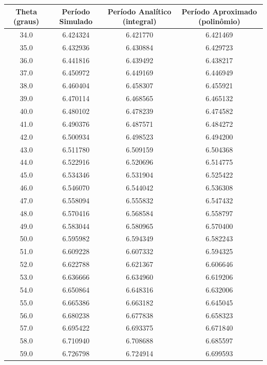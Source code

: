 \documentclass[12pt,a4paper]{article}
\begin{document}
\begin{table}[H]


\begin{center}
\begin{tabular}{|c|c|c|c|}
\hline
Theta (graus) & Período Simulado & Período Analítico (integral) & Período Aproximado (polinômio) \\
\hline
34.0 & 6.424324 & 6.421770 & 6.421469 \\
\hline
35.0 & 6.432936 & 6.430884 & 6.429723 \\
\hline
36.0 & 6.441816 & 6.439492 & 6.438217 \\
\hline
37.0 & 6.450972 & 6.449169 & 6.446949 \\
\hline
38.0 & 6.460404 & 6.458307 & 6.455921 \\
\hline
39.0 & 6.470114 & 6.468565 & 6.465132 \\
\hline
40.0 & 6.480102 & 6.478239 & 6.474582 \\
\hline
41.0 & 6.490376 & 6.487571 & 6.484272 \\
\hline
42.0 & 6.500934 & 6.498523 & 6.494200 \\
\hline
43.0 & 6.511780 & 6.509159 & 6.504368 \\
\hline
44.0 & 6.522916 & 6.520696 & 6.514775 \\
\hline
45.0 & 6.534346 & 6.531904 & 6.525422 \\
\hline
46.0 & 6.546070 & 6.544042 & 6.536308 \\
\hline
47.0 & 6.558094 & 6.555832 & 6.547432 \\
\hline
48.0 & 6.570416 & 6.568584 & 6.558797 \\
\hline
49.0 & 6.583044 & 6.580965 & 6.570400 \\
\hline
50.0 & 6.595982 & 6.594349 & 6.582243 \\
\hline
51.0 & 6.609228 & 6.607332 & 6.594325 \\
\hline
52.0 & 6.622788 & 6.621367 & 6.606646 \\
\hline
53.0 & 6.636666 & 6.634960 & 6.619206 \\
\hline
54.0 & 6.650864 & 6.648316 & 6.632006 \\
\hline
55.0 & 6.665386 & 6.663182 & 6.645045 \\
\hline
56.0 & 6.680238 & 6.677838 & 6.658323 \\
\hline
57.0 & 6.695422 & 6.693375 & 6.671840 \\
\hline
58.0 & 6.710940 & 6.708688 & 6.685597 \\
\hline
59.0 & 6.726798 & 6.724914 & 6.699593 \\

\end{tabular}
\end{center}
\end{table}
\end{document}
